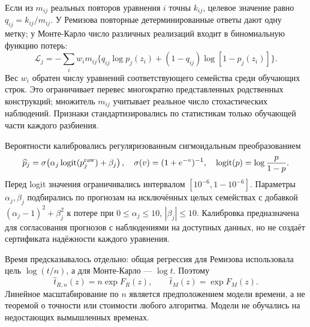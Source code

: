 Если из $m_{ij}$ реальных повторов уравнения $i$ точны $k_{ij}$, целевое значение равно $q_{ij}=k_{ij}/m_{ij}$. У Ремизова повторные детерминированные ответы дают одну метку; у Монте-Карло число различных реализаций входит в биномиальную функцию потерь:
\begin{equation}\label{eq:loss}
\mathcal L_j=-\sum_i w_i m_{ij}\{q_{ij}\log p_j(z_i)+(1-q_{ij})\log[1-p_j(z_i)]\}.
\end{equation}
Вес $w_i$ обратен числу уравнений соответствующего семейства среди обучающих строк. Это ограничивает перевес многократно представленных родственных конструкций; множитель $m_{ij}$ учитывает реальное число стохастических наблюдений. Признаки стандартизировались по статистикам только обучающей части каждого разбиения.

Вероятности калибровались регуляризованным сигмоидальным преобразованием
\begin{equation}\label{eq:calibration}
\widehat p_j=\sigma\!\left(\alpha_j\operatorname{logit}(p_j^{\rm raw})+\beta_j\right),\quad
\sigma(v)=(1+e^{-v})^{-1},\quad\operatorname{logit}(p)=\log\frac p{1-p}.
\end{equation}
Перед logit значения ограничивались интервалом $[10^{-6},1-10^{-6}]$. Параметры $\alpha_j,\beta_j$ подбирались по прогнозам на исключённых целых семействах с добавкой $(\alpha_j-1)^2+\beta_j^2$ к потере при $0\le\alpha_j\le10$, $|\beta_j|\le10$. Калибровка предназначена для согласования прогнозов с наблюдениями на доступных данных, но не создаёт сертификата надёжности каждого уравнения.

Время предсказывалось отдельно: общая регрессия для Ремизова использовала цель $\log(t/n)$, а для Монте-Карло --- $\log t$. Поэтому
\begin{equation}\label{eq:time}
\widehat t_{R,n}(z)=n\exp F_R(z),\qquad\widehat t_M(z)=\exp F_M(z).
\end{equation}
Линейное масштабирование по $n$ является предположением модели времени, а не теоремой о точности или стоимости любого алгоритма. Модели не обучались на недостающих вымышленных временах.

